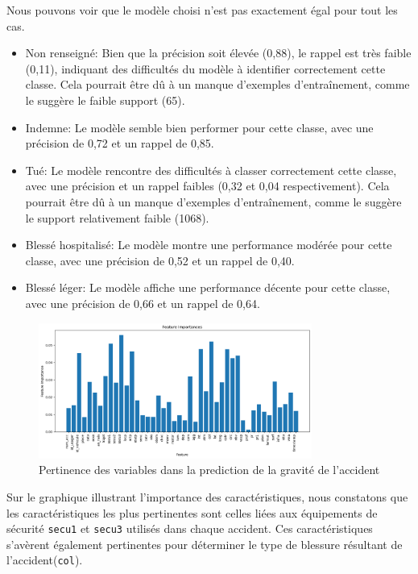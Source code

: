 \documentclass[french]{article}
\begin{document}
Nous pouvons voir que le modèle choisi n'est pas exactement égal pour tout les cas.
\begin{itemize}

    \item Non renseigné: Bien que la précision soit élevée (0,88), le rappel est très faible (0,11), indiquant des difficultés du modèle à identifier correctement cette classe. Cela pourrait être dû à un manque d’exemples d’entraînement, comme le suggère le faible support (65).

    \item Indemne: Le modèle semble bien performer pour cette classe, avec une précision de 0,72 et un rappel de 0,85.

    \item Tué: Le modèle rencontre des difficultés à classer correctement cette classe, avec une précision et un rappel faibles (0,32 et 0,04 respectivement). Cela pourrait être dû à un manque d’exemples d’entraînement, comme le suggère le support relativement faible (1068).

    \item Blessé hospitalisé: Le modèle montre une performance modérée pour cette classe, avec une précision de 0,52 et un rappel de 0,40.

    \item Blessé léger: Le modèle affiche une performance décente pour cette classe, avec une précision de 0,66 et un rappel de 0,64.
\end{itemize}



\begin{figure}[h]
  \centering
  \includegraphics[width=0.8\textwidth]{img/feature_importance.png}
  \caption{Pertinence des variables dans la prediction de la gravité de l'accident}
  \label{fig:nom_figure}
\end{figure}

Sur le graphique illustrant l'importance des caractéristiques, nous constatons que les caractéristiques les plus pertinentes sont celles liées aux équipements de sécurité \verb|secu1| et \verb|secu3| utilisés dans chaque accident. Ces caractéristiques s'avèrent également pertinentes pour déterminer le type de blessure résultant de l'accident(\verb|col|).
\end{document}
